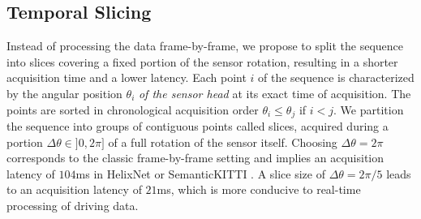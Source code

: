\documentclass[runningheads]{tpls/llncs}
\begin{document}
\subsection{Temporal Slicing}\label{sec:slices}
Instead of processing the data frame-by-frame, we propose to split the sequence into slices covering a fixed portion of the sensor rotation, resulting in a shorter acquisition time and a lower latency.
Each point $i$ of the sequence is characterized by the angular position $\theta_i$ \emph{of the sensor head} at its exact time of acquisition. The points are sorted in chronological acquisition order \ie $\theta_i \leq \theta_j$ if $i<j$.
We partition the sequence into groups of contiguous points called slices, acquired during a portion $\Delta \theta \in ]0,2\pi]$ of a full rotation of the sensor itself. Choosing $\Delta \theta = 2\pi$ corresponds to the classic frame-by-frame setting and implies an acquisition latency of $104$ms in HelixNet or SemanticKITTI \cite{behley2019iccv}. A slice size of $\Delta \theta=2{\pi}/5$ leads to an acquisition latency of $21$ms, which is more conducive to real-time processing of driving data.
\end{document}
